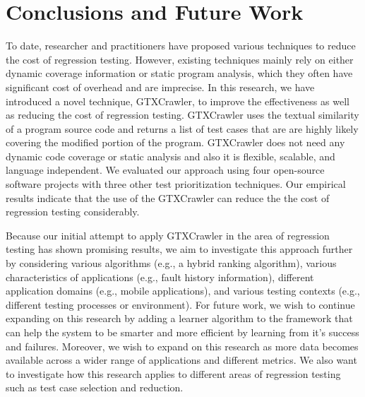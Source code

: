 
\section{Conclusions and Future Work}
\label{sec:conclusions}

To date, researcher and practitioners  
have proposed various techniques 
to reduce the cost of regression testing.
However, existing techniques mainly rely on either dynamic
coverage information or static program analysis, 
which they often have significant
cost of overhead and are imprecise.
In this research, we have introduced a novel 
technique, GTXCrawler, to improve the effectiveness as well 
as reducing the cost of regression testing.
GTXCrawler uses the textual similarity 
of a program source code and returns 
a list of test cases that are
are highly likely covering the modified portion 
of the program.
GTXCrawler does not need any dynamic code coverage 
or static analysis and also it is flexible, scalable, and 
language independent. 
We evaluated our approach using four open-source software projects 
with three other test prioritization techniques.
Our empirical results indicate that the use of the GTXCrawler can reduce 
the the cost of regression testing considerably. 



Because our initial attempt to apply GTXCrawler in the area of 
regression testing has shown promising results, 
we aim to investigate this approach further by 
considering various algorithms (e.g., a hybrid ranking algorithm), 
various characteristics of applications
(e.g., fault history information), 
different application domains (e.g., mobile applications), 
and various testing contexts (e.g., different testing processes or environment). 
For future work, we wish to continue expanding on 
this research by adding a learner algorithm to the framework
that can help the system to be smarter and more efficient by learning 
from it's success and failures.
Moreover, we wish to expand on 
this research as more data becomes available across a 
wider range of applications and different metrics. 
We also want to investigate how this research applies to 
different areas of regression testing such as 
test case selection and reduction.
